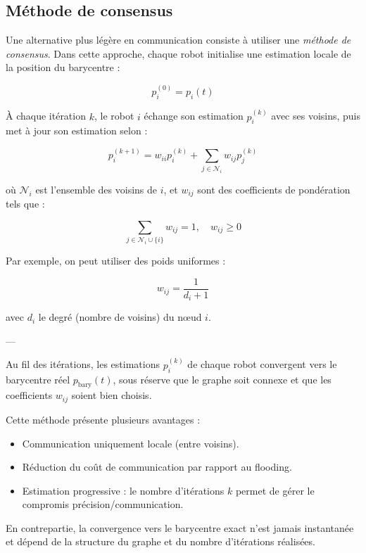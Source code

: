 \subsection{Méthode de consensus}

Une alternative plus légère en communication consiste à utiliser une \textit{méthode de consensus}.  
Dans cette approche, chaque robot initialise une estimation locale de la position du barycentre :

\begin{equation}
p_i^{(0)} = p_i(t)
\end{equation}

À chaque itération $k$, le robot $i$ échange son estimation $p_i^{(k)}$ avec ses voisins, puis met à jour son estimation selon :

\begin{equation}
p_i^{(k+1)} = w_{ii} p_i^{(k)} + \sum_{j \in \mathcal{N}_i} w_{ij} p_j^{(k)}
\end{equation}

où $\mathcal{N}_i$ est l’ensemble des voisins de $i$, et $w_{ij}$ sont des coefficients de pondération tels que :

\begin{equation}
\sum_{j \in \mathcal{N}_i \cup \{i\}} w_{ij} = 1, \quad w_{ij} \geq 0
\end{equation}

Par exemple, on peut utiliser des poids uniformes :

\begin{equation}
w_{ij} = \frac{1}{d_i + 1}
\end{equation}

avec $d_i$ le degré (nombre de voisins) du nœud $i$.

---

Au fil des itérations, les estimations $p_i^{(k)}$ de chaque robot convergent vers le barycentre réel $p_{\text{bary}}(t)$, sous réserve que le graphe soit connexe et que les coefficients $w_{ij}$ soient bien choisis.

Cette méthode présente plusieurs avantages :
\begin{itemize}
    \item Communication uniquement locale (entre voisins).
    \item Réduction du coût de communication par rapport au flooding.
    \item Estimation progressive : le nombre d’itérations $k$ permet de gérer le compromis précision/communication.
\end{itemize}

En contrepartie, la convergence vers le barycentre exact n’est jamais instantanée et dépend de la structure du graphe et du nombre d’itérations réalisées.